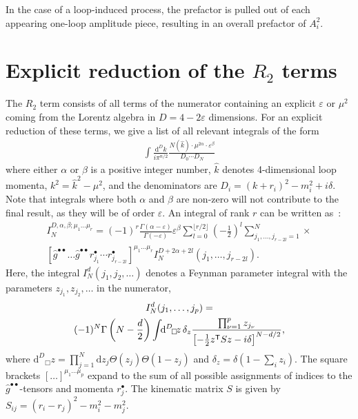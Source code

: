 \documentclass[11pt,a4paper]{refrep}
\newcommand{\diff}[1][{}]{{\mathrm{d}}^{#1}\!}
\begin{document}
In the case of a loop-induced process, the prefactor is pulled out of each appearing one-loop amplitude piece, resulting in an overall prefactor of $A_i^2$.

\chapter{Explicit reduction of the $R_2$ terms}
The $R_2$ term \cite{Ossola:2008xq} consists of all terms of the numerator
containing an explicit $\varepsilon$ or $\mu^2$ coming from the Lorentz
algebra in $D=4-2\varepsilon$ dimensions. 
For an explicit reduction of these terms, we give a list of all relevant integrals of the form
\begin{align}
\int\frac{\diff[D] k}{i\pi^{n/2}}
\frac{N(\hat{k})\cdot\mu^{2\alpha}\cdot\varepsilon^\beta}{D_0\cdots D_N}
\end{align}
where either $\alpha$ or $\beta$ is a positive integer number, 
$\hat{k}$ denotes 4-dimensional loop momenta, $k^2=\hat{k}^2-\mu^2$, 
and the denominators are $D_i=(k+r_i)^2-m_i^2+i\delta$.
Note that integrals where both $\alpha$ and $\beta$ are
non-zero will not contribute to the final result, as they will be of order $\varepsilon$.
An integral of rank $r$ 
can be written as~\cite{Binoth:2005ff,Reiter:2009kb}:
\begin{multline}
I_N^{D,\alpha,\beta;\mu_1\ldots\mu_r}=
(-1)^{r}\frac{\Gamma(\alpha-\varepsilon)}{\Gamma(-\varepsilon)}
\varepsilon^\beta
\sum_{l=0}^{\lfloor r/2\rfloor}\left(-\frac12\right)^l
\sum_{j_1,\ldots,j_{r-2l}=1}^N
\times\\
\left[\hat{g}^{\bullet\bullet}\ldots
\hat{g}^{\bullet\bullet}r_{j_1}^\bullet
\cdots r_{j_{r-2l}}^\bullet\right]^{\mu_1\ldots\mu_r}
I_N^{D+2\alpha+2l}(j_1,\ldots,j_{r-2l}).
\end{multline}
Here, the integral $I_N^d(j_1,j_2,\ldots)$ denotes a Feynman parameter
integral with the parameters $z_{j_1}, z_{j_2}, \ldots$ in the numerator,
\begin{multline}
I_N^d(j_1,\ldots, j_p)=\\
(-1)^N\Gamma\left(N-\frac{d}2\right)%
\int\!\!\diff[D]_\Box\!z\,\delta_z
\frac{\prod_{\nu=1}^p z_{j_\nu}}{%
\left[-\frac12 z^{\mathsf{T}}Sz-i\delta\right]^{N-d/2}},
\end{multline}
where $\diff[D]_\Box\!z=
\prod_{j=1}^N\mathrm{d}z_j\Theta(z_j)\Theta(1-z_j)$
and $\delta_z=\delta(1-\sum_i z_i)$.
The square brackets $[\ldots]^{\mu_1\ldots\mu_p}$ expand to the sum of
all possible assignments of indices to the $\hat{g}^{\bullet\bullet}$-tensors
and momenta $r_j^\bullet$. 
The kinematic matrix $S$ is given by $S_{ij}=(r_i-r_j)^2-m_i^2-m_j^2$.
\end{document}
